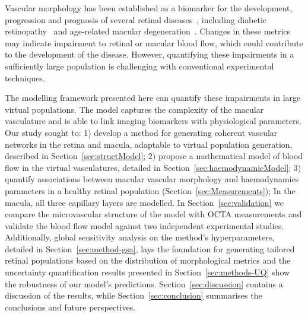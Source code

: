 \documentclass[11pt,]{article}
\begin{document}
Vascular morphology has been established as a biomarker for the development, progression and prognosis of several retinal diseases~\cite{Balaratnasingam_2023,Yao_2020}, including diabetic retinopathy~\cite{Garg2022,Hein_2023} and age-related macular degeneration~\cite{Told2023,Narnaware_2023}.
Changes in these metrics may indicate impairment to retinal or macular blood flow, which could contribute to the development of the disease.
However, quantifying these impairments in a sufficiently large population is challenging with conventional experimental techniques.

The modelling framework presented here can quantify these impairments in large virtual populations.
The model captures the complexity of the macular vasculature and is able to link imaging biomarkers with physiological parameters.
Our study sought to: 1) develop a method for generating coherent vascular networks in the retina and macula, adaptable to virtual population generation, described in Section~\ref{sec:structModel};
2) propose a mathematical model of blood flow in the virtual vasculatures, detailed in Section~\ref{sec:haemodynamicModel};
3) quantify associations between macular vascular morphology and haemodynamics parameters in a healthy retinal population (Section~\ref{sec:Measurements});
In the macula, all three capillary layers are modelled.
In Section~\ref{sec:validation} we compare the microvascular structure of the model with OCTA measurements and validate the blood flow model against two independent experimental studies.
Additionally, global sensitivity analysis on the method's hyperparameters, detailed in Section~\ref{sec:method-gsa}, lays the foundation for generating tailored retinal populations based on the distribution of morphological metrics and the uncertainty quantification results presented in Section~\ref{sec:methods-UQ} show the robustness of our model's predictions. 
Section~\ref{sec:discussion} contains a discussion of the results, while Section~\ref{sec:conclusion} summarises the conclusions and future perspectives.
\end{document}
